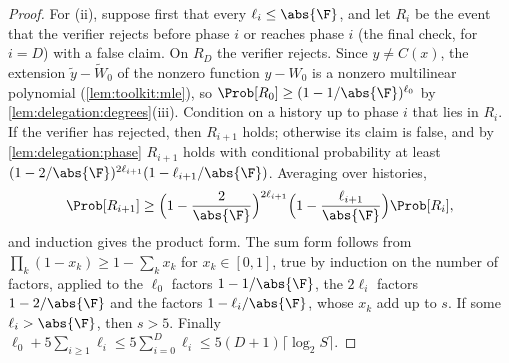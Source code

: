 \begin{refsection}
\begin{proof}
For (ii), suppose first that every $\ell_i\le\abs{\F}$, and let $R_i$ be the event that the verifier rejects before phase $i$ or reaches phase $i$ (the final check, for $i=D$) with a false claim. On $R_D$ the verifier rejects. Since $y\ne C(x)$, the extension $\tilde y-\tilde W_0$ of the nonzero function $y-W_0$ is a nonzero multilinear polynomial (\cref{lem:toolkit:mle}), so $\Prob[R_0]\ge(1-1/\abs{\F})^{\ell_0}$ by \cref{lem:delegation:degrees}(iii). Condition on a history up to phase $i$ that lies in $R_i$. If the verifier has rejected, then $R_{i+1}$ holds; otherwise its claim is false, and by \cref{lem:delegation:phase} $R_{i+1}$ holds with conditional probability at least $(1-2/\abs{\F})^{2\ell_{i+1}}(1-\ell_{i+1}/\abs{\F})$. Averaging over histories,
\[
\Prob[R_{i+1}]\ge\Bigl(1-\frac2{\abs{\F}}\Bigr)^{2\ell_{i+1}}\Bigl(1-\frac{\ell_{i+1}}{\abs{\F}}\Bigr)\Prob[R_i],
\]
and induction gives the product form. The sum form follows from $\prod_k(1-x_k)\ge1-\sum_kx_k$ for $x_k\in[0,1]$, true by induction on the number of factors, applied to the $\ell_0$ factors $1-1/\abs{\F}$, the $2\ell_i$ factors $1-2/\abs{\F}$ and the factors $1-\ell_i/\abs{\F}$, whose $x_k$ add up to $s$. If some $\ell_i>\abs{\F}$, then $s>5$. Finally $\ell_0+5\sum_{i\ge1}\ell_i\le5\sum_{i=0}^D\ell_i\le5(D+1)\lceil\log_2S\rceil$.


\end{proof}
\end{refsection}
